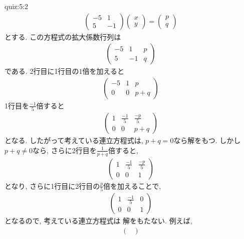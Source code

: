 \begin{answerof}{quiz:5:2}
  \begin{align*}
    \begin{pmatrix}
      -5&1\\5&-1
    \end{pmatrix}
    \begin{pmatrix}
      x\\y
    \end{pmatrix}=
    \begin{pmatrix}
      p\\q
    \end{pmatrix}
  \end{align*}
  とする. この方程式の拡大係数行列は
  \begin{align*}
    \begin{pmatrix}
      -5&1&p\\5&-1&q
    \end{pmatrix}
  \end{align*}
  である.
  2行目に1行目の$1$倍を加えると
  \begin{align*}
    \begin{pmatrix}
      -5&1&p\\0&0&p+q
    \end{pmatrix}
  \end{align*}
  1行目を$\frac{-1}{5}$倍すると
  \begin{align*}
    \begin{pmatrix}
      1&\frac{-1}{5}&\frac{-p}{5}\\0&0&p+q
    \end{pmatrix}
  \end{align*}
  となる.
  したがって考えている連立方程式は,
  $p+q=0$なら解をもつ.
  しかし
  $p+q\neq 0$なら,
  さらに2行目を$\frac{1}{p+q}$倍すると,
  \begin{align*}
    \begin{pmatrix}
      1&\frac{-1}{5}&\frac{-p}{5}\\0&0&1
    \end{pmatrix}
  \end{align*}
  となり,
  さらに1行目に2行目の$\frac{p}{5}$倍を加えることで,
  \begin{align*}
    \begin{pmatrix}
      1&\frac{-1}{5}&0\\0&0&1
    \end{pmatrix}
  \end{align*}
  となるので,
  考えている連立方程式は
  解をもたない.
  例えば,
  \begin{align*}
    \begin{pmatrix}

\end{pmatrix}
\end{align*}
\end{answerof}
